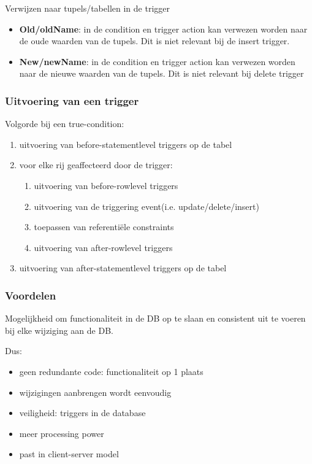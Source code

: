 \documentclass[a4paper,12pt]{article}
\begin{document}
Verwijzen naar tupels/tabellen in de trigger
\begin{itemize}
\item \textbf{Old/oldName}: in de condition en trigger action kan verwezen worden naar de oude waarden van de tupels.
Dit is niet relevant bij de insert trigger.
\item \textbf{New/newName}: in de condition en trigger action kan verwezen worden naar de nieuwe waarden van de tupels.
Dit is niet relevant bij delete trigger
\end{itemize}

\subsubsection{Uitvoering van een trigger}
Volgorde bij een true-condition:
\begin{enumerate}
\item uitvoering van before-statementlevel triggers op de tabel
\item voor elke rij geaffecteerd door de trigger:
\begin{enumerate}
\item uitvoering van before-rowlevel triggers
\item uitvoering van de triggering event(i.e. update/delete/insert)
\item toepassen van referentiële constraints
\item uitvoering van after-rowlevel triggers
\end{enumerate}
\item uitvoering van after-statementlevel triggers op de tabel
\end{enumerate}

\subsubsection{Voordelen}
Mogelijkheid om functionaliteit in de DB op te slaan en consistent uit te voeren bij elke wijziging aan de DB.

Dus:
\begin{itemize}
\item geen redundante code: functionaliteit op 1 plaats
\item wijzigingen aanbrengen wordt eenvoudig
\item veiligheid: triggers in de database
\item meer processing power
\item past in client-server model
\end{itemize}
\end{document}
